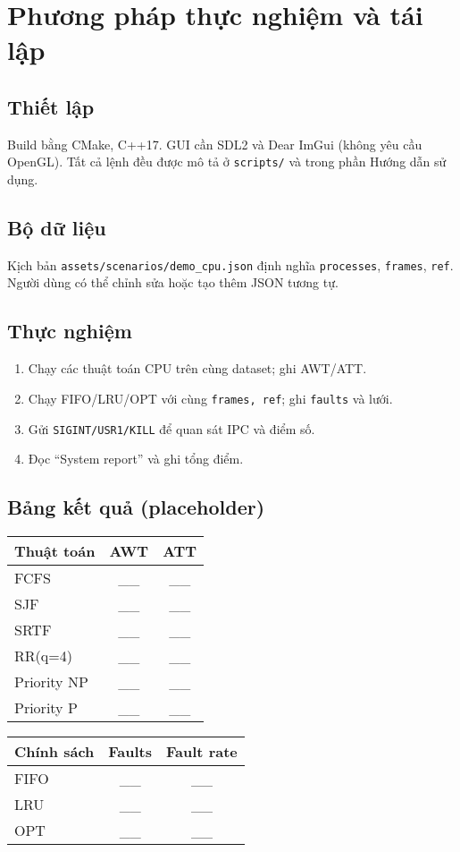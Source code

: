 \documentclass[12pt,a4paper]{report}
\begin{document}
\chapter{Phương pháp thực nghiệm và tái lập}
\section{Thiết lập}
Build bằng CMake, C++17. GUI cần SDL2 và Dear ImGui (không yêu cầu OpenGL). Tất cả lệnh đều được mô tả ở \texttt{scripts/} và trong phần Hướng dẫn sử dụng.

\section{Bộ dữ liệu}
Kịch bản \texttt{assets/scenarios/demo\_cpu.json} định nghĩa \texttt{processes}, \texttt{frames}, \texttt{ref}. Người dùng có thể chỉnh sửa hoặc tạo thêm JSON tương tự.

\section{Thực nghiệm}
\begin{enumerate}
  \item Chạy các thuật toán CPU trên cùng dataset; ghi AWT/ATT.
  \item Chạy FIFO/LRU/OPT với cùng \texttt{frames, ref}; ghi \texttt{faults} và lưới.
  \item Gửi \texttt{SIGINT/USR1/KILL} để quan sát IPC và điểm số.
  \item Đọc “System report” và ghi tổng điểm.
\end{enumerate}

\section{Bảng kết quả (placeholder)}
\begin{longtable}{@{}lcc@{}}
\toprule Thuật toán & AWT & ATT \\\midrule
FCFS & \_\_ & \_\_ \\
SJF  & \_\_ & \_\_ \\
SRTF & \_\_ & \_\_ \\
RR(q=4) & \_\_ & \_\_ \\
Priority NP & \_\_ & \_\_ \\
Priority P & \_\_ & \_\_ \\\bottomrule
\end{longtable}

\begin{longtable}{@{}lcc@{}}
\toprule Chính sách & Faults & Fault rate \\\midrule
FIFO & \_\_ & \_\_ \\
LRU  & \_\_ & \_\_ \\
OPT  & \_\_ & \_\_ \\\bottomrule
\end{longtable}
\end{document}
